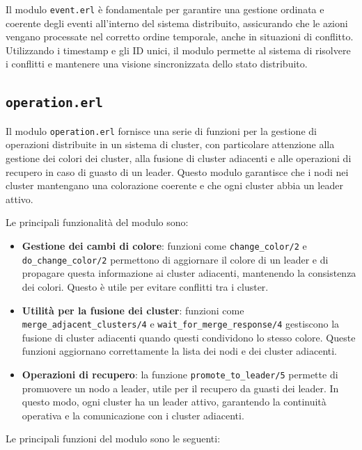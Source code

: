 \documentclass[12pt, a4paper]{report}
\begin{document}
\noindent
Il modulo \texttt{event.erl} \`e fondamentale per garantire una gestione ordinata e coerente degli eventi all'interno del sistema distribuito, assicurando che le azioni vengano processate nel corretto ordine temporale, anche in situazioni di conflitto. Utilizzando i timestamp e gli ID unici, il modulo permette al sistema di risolvere i conflitti e mantenere una visione sincronizzata dello stato distribuito.

\subsection{\texttt{operation.erl}}

Il modulo \texttt{operation.erl} fornisce una serie di funzioni per la gestione di operazioni distribuite in un sistema di cluster, con particolare attenzione alla gestione dei colori dei cluster, alla fusione di cluster adiacenti e alle operazioni di recupero in caso di guasto di un leader. Questo modulo garantisce che i nodi nei cluster mantengano una colorazione coerente e che ogni cluster abbia un leader attivo.

Le principali funzionalità del modulo sono:

\begin{itemize}
    \item \textbf{Gestione dei cambi di colore}: funzioni come \texttt{change\_color/2} e \texttt{do\_change\_color/2} permettono di aggiornare il colore di un leader e di propagare questa informazione ai cluster adiacenti, mantenendo la consistenza dei colori. Questo \`e utile per evitare conflitti tra i cluster.

    \item \textbf{Utilità per la fusione dei cluster}: funzioni come \texttt{merge\_adjacent\_clusters/4} e \texttt{wait\_for\_merge\_response/4} gestiscono la fusione di cluster adiacenti quando questi condividono lo stesso colore. Queste funzioni aggiornano correttamente la lista dei nodi e dei cluster adiacenti.

    \item \textbf{Operazioni di recupero}: la funzione \texttt{promote\_to\_leader/5} permette di promuovere un nodo a leader, utile per il recupero da guasti dei leader. In questo modo, ogni cluster ha un leader attivo, garantendo la continuità operativa e la comunicazione con i cluster adiacenti.

\end{itemize}

\noindent
Le principali funzioni del modulo sono le seguenti:
\end{document}
